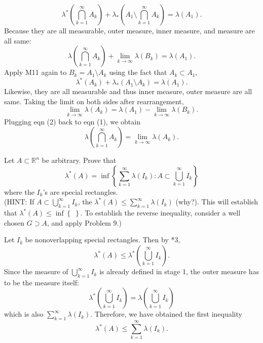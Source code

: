 \documentclass[answers]{exam}
\begin{document}
\begin{questions}
\begin{solution}
   $$
   \lambda^{*}\left(\bigcap_{k=1}^{\infty}A_{k}\right) + \lambda_{*}\left(A_{1}\setminus \bigcap_{k=1}^{\infty}A_{k}\right) = \lambda\left(A_{1}\right).
   $$
   Because they are all measurable, outer measure, inner measure, and measure are all same:
   \begin{equation}
   \lambda\left(\bigcap_{k=1}^{\infty}A_{k}\right) + \lim_{k\to\infty}\lambda\left(B_{k}\right) = \lambda\left(A_{1}\right).
   \end{equation}
   Apply M11 again to $B_{k}=A_{1}\setminus A_{k}$ using the fact that $A_{k} \subset A_{1}$,
   $$
   \lambda^{*}\left(A_{k}\right) + \lambda_{*}\left(A_{1}\setminus A_{k}\right) = \lambda\left(A_{1}\right).
   $$
   Likewise, they are all measurable and thus inner measure, outer measure are all same. Taking the limit on both sides after rearrangement,
   \begin{equation}
      \lim_{k\to\infty}\lambda\left(A_{k}\right)  = \lambda\left(A_{1}\right) - \lim_{k\to\infty} \lambda\left(B_{k}\right).
   \end{equation}
   Plugging eqn (2) back to eqn (1), we obtain
   $$
      \lambda\left(\bigcap_{k=1}^{\infty}A_{k}\right) = \lim_{k\to\infty}\lambda\left(A_{k}\right).
   $$
   \end{solution}
   \question
   Let $A \subset \mathbb{R}^{n}$ be arbitrary. Prove that
   $$
   \lambda^{*}\left(A\right) = \inf \left\{\sum_{k=1}^{\infty}\lambda\left(I_{k}\right): A \subset \bigcup_{k=1}^{\infty}I_{k} \right\}
   $$
   where the $I_{k}$'s are special rectangles.\\
   (HINT: If $A \subset \bigcup_{k=1}^{\infty} I_{k}$, the $\lambda^{*}\left(A\right)\leq \sum_{k=1}^{\infty}\lambda\left(I_{k}\right)$ (why?). This will establish that $\lambda^{*}\left(A\right) \leq \inf \left\{\; \right\}$. To establish the reverse inequality, consider a well chosen $G \supset A$, and apply Problem 9.)
   \begin{solution}
   Let $I_{k}$ be nonoverlapping special rectangles. Then by *3,
   $$
   \lambda^{*}\left(A\right) \leq \lambda^{*}\left(\bigcup_{k=1}^{\infty}I_{k}\right).
   $$
   Since the measure of $\bigcup_{k=1}^{\infty}I_{k}$ is already defined in stage 1, the outer measure has to be the measure itself:
   $$
   \lambda^{*}\left(\bigcup_{k=1}^{\infty}I_{k}\right) = \lambda\left(\bigcup_{k=1}^{\infty}I_{k}\right)
   $$
   which is also $\sum_{k=1}^{\infty}\lambda\left(I_{k}\right)$. Therefore, we have obtained the first inequality
   $$
   \lambda^{*}\left(A\right) \leq \sum_{k=1}^{\infty}\lambda\left(I_{k}\right).
$$
\end{solution}
\end{questions}
\end{document}
